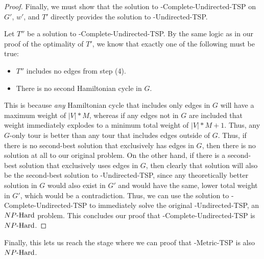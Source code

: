 \begin{proof}
    Finally, we must show that the solution to \inob{}-Complete-Undirected-TSP on $G'$, $w'$, and $T'$ directly provides the solution to \inob{}-Undirected-TSP.

    Let $T''$ be a solution to \inob{}-Complete-Undirected-TSP. By the same logic as in our proof of the optimality of $T'$, we know that exactly one of the following must be true:
    \begin{itemize}
        \item $T''$ includes no edges from step (4).
        \item There is no second Hamiltonian cycle in $G$.
    \end{itemize}
    This is because \textit{any} Hamiltonian cycle that includes only edges in $G$ will have a maximum weight of $|V|*M$, whereas if any edges not in $G$ are included that weight immediately explodes to a minimum total weight of $|V|*M + 1$. Thus, any $G$-only tour is better than any tour that includes edges outside of $G$. Thus, if there is no second-best solution that exclusively has edges in $G$, then there is no solution at all to our original problem. On the other hand, if there is a second-best solution that exclusively uses edges in $G$, then clearly that solution will also be the second-best solution to \inob{}-Undirected-TSP, since any theoretically better solution in $G$ would also exist in $G'$ and would have the same, lower total weight in $G'$, which would be a contradiction. Thus, we can use the solution to \inob{}-Complete-Undirected-TSP to immediately solve the original \inob{}-Undirected-TSP, an ${NP\text{-Hard{}}}$ problem. This concludes our proof that \inob{}-Complete-Undirected-TSP is ${NP\text{-Hard{}}}$.
\end{proof}
Finally, this lets us reach the stage where we can proof that \inob{}-Metric-TSP is also ${NP\text{-Hard{}}}$.

